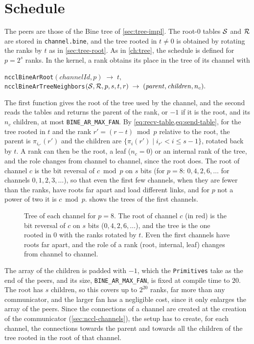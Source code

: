 \section{Schedule}\label{sec:tar-schedule}
The peers are those of the Bine tree of \cref{sec:tree-impl}.
The root-$0$ tables $\mathcal{S}$ and $\mathcal{R}$ are stored in \texttt{channel.bine}, and the tree rooted in $t\neq0$ is obtained by rotating the ranks by $t$ as in \cref{sec:tree-root}.
As in \cref{ch:tree}, the schedule is defined for $p=2^s$ ranks.
In the kernel, a rank obtains its place in the tree of its channel with
\begin{center}\small
\texttt{ncclBineArRoot}$(\mathit{channelId},p)\;\rightarrow\;t,$\\
\texttt{ncclBineArTreeNeighbors}$(\mathcal{S},\mathcal{R},p,s,t,r)\;\rightarrow\;(\mathit{parent},\mathit{children},n_c).$
\end{center}
The first function gives the root of the tree used by the channel, and the second reads the tables and returns the parent of the rank, or $-1$ if it is the root, and its $n_c$ children, at most \texttt{BINE\_AR\_MAX\_FAN}.
By \cref{eq:recv-table,eq:send-table}, for the tree rooted in $t$ and the rank $r'=(r-t)\bmod p$ relative to the root, the parent is $\pi_{i_{r'}}(r')$ and the children are $\{\pi_i(r')\mid i_{r'}<i\le s-1\}$, rotated back by $t$.
A rank can then be the root, a leaf ($n_c=0$) or an internal rank of the tree, and the role changes from channel to channel, since the root does.
The root of channel $c$ is the bit reversal of $c \bmod p$ on $s$ bits (for $p=8$: $0,4,2,6,\dots$ for channels $0,1,2,3,\dots$), so that even the first few channels, when they are fewer than the ranks, have roots far apart and load different links, and for $p$ not a power of two it is $c\bmod p$.
 shows the trees of the first channels.
\begin{figure}[t]
  \centering
  \hfill
  \hfill
  \caption{Tree of each channel for $p=8$. The root of channel $c$ (in red) is the bit
           reversal of $c$ on $s$ bits ($0,4,2,6,\dots$), and the tree is the one rooted
           in $0$ with the ranks rotated by $t$. Even the first channels have roots far
           apart, and the role of a rank (root, internal, leaf) changes from channel to
           channel.}
  \label{fig:tar-roots}
\end{figure}
The array of the children is padded with $-1$, which the \texttt{Primitives} take as the end of the peers, and its size, \texttt{BINE\_AR\_MAX\_FAN}, is fixed at compile time to $20$.
The root has $s$ children, so this covers up to $2^{20}$ ranks, far more than any communicator, and the larger fan has a negligible cost, since it only enlarges the array of the peers.
Since the connections of a channel are created at the creation of the communicator (\cref{sec:nccl-channels}), the setup has to create, for each channel, the connections towards the parent and towards all the children of the tree rooted in the root of that channel.
